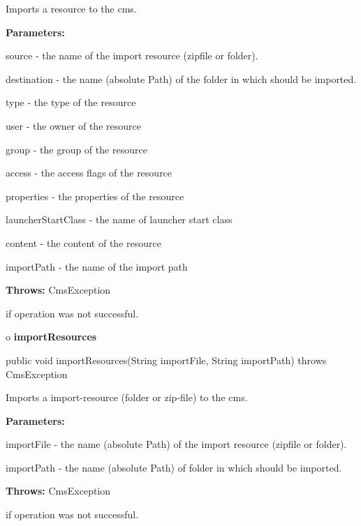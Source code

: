 \begin{description}
\htmlDD Imports a resource to the cms. 

\begin{description}
\item {\bf Parameters:}  

source - the name of the import resource (zipfile or folder).  

destination - the name (absolute Path) of the folder in which should be
imported.  

type - the type of the resource  

user - the owner of the resource  

group - the group of the resource  

access - the access flags of the resource  

properties - the properties of the resource  

launcherStartClass - the name of launcher start class  

content - the content of the resource  

importPath - the name of the import path  
\item {\bf Throws:} CmsException  

if operation was not successful.  
\end{description}

\end{description}

o {\bf importResources} 

\begin{PRE}
 public void importResources(String importFile,
                             String importPath) throws CmsException
\end{PRE}

\begin{description}
\htmlDD Imports a import-resource (folder or zip-file) to the cms. 

\begin{description}
\item {\bf Parameters:}  

importFile - the name (absolute Path) of the import resource (zipfile or
folder).  

importPath - the name (absolute Path) of folder in which should be imported.  
\item {\bf Throws:} CmsException  

if operation was not successful.  
\end{description}

\end{description}


